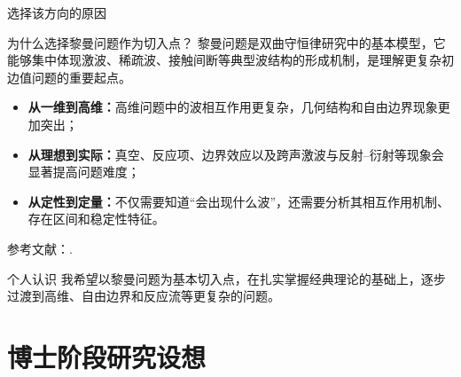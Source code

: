 \documentclass{beamer}
\begin{document}
\begin{frame}[shrink=5]{选择该方向的原因}
\begin{block}{为什么选择黎曼问题作为切入点？}
黎曼问题是双曲守恒律研究中的基本模型，它能够集中体现激波、稀疏波、接触间断等典型波结构的形成机制，是理解更复杂初边值问题的重要起点。
\end{block}

\begin{itemize}
    \item \textbf{从一维到高维：}高维问题中的波相互作用更复杂，几何结构和自由边界现象更加突出；
    \item \textbf{从理想到实际：}真空、反应项、边界效应以及跨声激波与反射--衍射等现象会显著提高问题难度；
    \item \textbf{从定性到定量：}不仅需要知道“会出现什么波”，还需要分析其相互作用机制、存在区间和稳定性特征。
\end{itemize}

\vspace{0.2em}
{\scriptsize 参考文献：\cite{ZhangZheng1990,ChenFeldman2003,ChenFeldman2018}.}

\begin{alertblock}{个人认识}
我希望以黎曼问题为基本切入点，在扎实掌握经典理论的基础上，逐步过渡到高维、自由边界和反应流等更复杂的问题。
\end{alertblock}
\end{frame}























\section{博士阶段研究设想}
\end{document}
